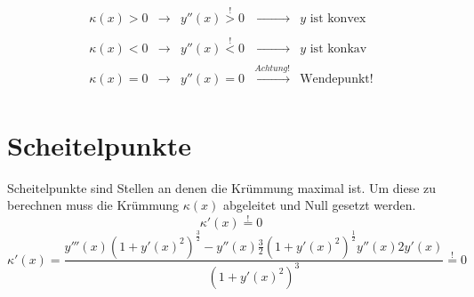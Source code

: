 \[\boxed{\begin{array}{lllll} 
	\kappa (x) > 0 & \rightarrow & y''(x) \stackrel{!}{>} 0 & \xrightarrow[]{\phantom{Achtung!}} & y \text{ ist konvex} \\
	\kappa (x) < 0 & \rightarrow & y''(x) \stackrel{!}{<} 0 & \xrightarrow[]{\phantom{Achtung!}} & y \text{ ist konkav} \\
	\kappa (x) = 0 & \rightarrow & y''(x) = 0		& \xrightarrow[]{Achtung!} & \text{Wendepunkt!}
\end{array}}\]
\section{Scheitelpunkte}
Scheitelpunkte sind Stellen an denen die Krümmung maximal ist. 
Um diese zu berechnen muss die Krümmung $\kappa (x)$ abgeleitet und Null gesetzt werden.
\[ \kappa '(x) \stackrel{!}{=} 0  \]
\[ \boxed{\kappa '(x) = \dfrac{ y'''(x)(1+y'(x)^2)^{\frac{3}{2}} - y''(x) \frac{3}{2}(1+y'(x)^2)^{\frac{1}{2}} y''(x) 2y'(x) }{ (1+y'(x)^2)^3 } \stackrel{!}{=} 0 } \]
